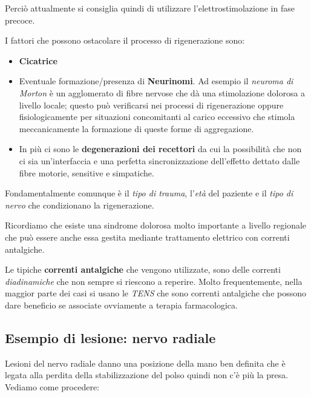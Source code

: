 Perciò attualmente si consiglia quindi di utilizzare
l'elettrostimolazione in fase precoce.

I fattori che possono ostacolare il processo di rigenerazione sono:

\begin{itemize}
\item
  \textbf{Cicatrice}
\item
  Eventuale formazione/presenza di \textbf{Neurinomi}. Ad esempio il
  \emph{neuroma di Morton} è un agglomerato di fibre nervose che dà una
  stimolazione dolorosa a livello locale; questo può verificarsi nei
  processi di rigenerazione oppure fisiologicamente per situazioni
  concomitanti al carico eccessivo che stimola meccanicamente la
  formazione di queste forme di aggregazione.
\item
  In più ci sono le \textbf{degenerazioni dei recettori} da cui la
  possibilità che non ci sia un'interfaccia e una perfetta
  sincronizzazione dell'effetto dettato dalle fibre motorie, sensitive e
  simpatiche.
\end{itemize}

Fondamentalmente comunque è il \emph{tipo di trauma}, l'\emph{età} del
paziente e il \emph{tipo di nervo} che condizionano la rigenerazione.

Ricordiamo che esiste una sindrome dolorosa molto importante a livello
regionale che può essere anche essa gestita mediante trattamento
elettrico con correnti antalgiche.

Le tipiche \textbf{correnti antalgiche} che vengono utilizzate, sono
delle correnti \emph{diadinamiche} che non sempre si riescono a
reperire. Molto frequentemente, nella maggior parte dei casi si usano le
\emph{TENS} che sono correnti antalgiche che possono dare beneficio se
associate ovviamente a terapia farmacologica.

\subsection{Esempio di lesione: nervo radiale}

Lesioni del nervo radiale danno una posizione della mano ben definita
che è legata alla perdita della stabilizzazione del polso quindi non c'è
più la presa. Vediamo come procedere:

